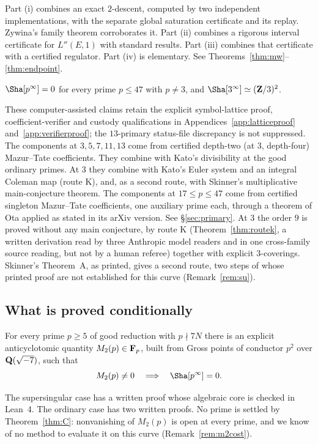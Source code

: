 Part (i) combines an exact $2$-descent, computed by two independent implementations, with the separate global saturation certificate and its replay. Zywina's family theorem \cite{zywina} corroborates it. Part (ii) combines a rigorous interval certificate for $L''(E,1)$ with standard results. Part (iii) combines that certificate with a certified regulator. Part (iv) is elementary. See Theorems~\ref{thm:mw}--\ref{thm:endpoint}.

\begin{theorem}\label{thm:B}
$\Sha[p^\infty]=0$ for every prime $p\le47$ with $p\ne3$, and $\Sha[3^\infty]\simeq(\Z/3)^2$.
\end{theorem}

These computer-assisted claims retain the explicit symbol-lattice proof, coefficient-verifier and custody qualifications in Appendices~\ref{app:latticeproof} and~\ref{app:verifierproof}; the $13$-primary status-file discrepancy is not suppressed. The components at $3,5,7,11,13$ come from certified depth-two (at $3$, depth-four) Mazur--Tate coefficients. They combine with Kato's divisibility at the good ordinary primes. At $3$ they combine with Kato's Euler system and an integral Coleman map (route K), and, as a second route, with Skinner's multiplicative main-conjecture theorem. The components at $17\le p\le47$ come from certified singleton Mazur--Tate coefficients, one auxiliary prime each, through a theorem of Ota \cite{ota} applied as stated in its arXiv version. See \S\ref{sec:primary}. At $3$ the order $9$ is proved without any main conjecture, by route K (Theorem~\ref{thm:routek}, a written derivation read by three Anthropic model readers and in one cross-family source reading, but not by a human referee) together with explicit $3$-coverings. Skinner's Theorem~A, as printed, gives a second route, two steps of whose printed proof are not established for this curve (Remark~\ref{rem:su}).

\subsection{What is proved conditionally}
\begin{theorem}\label{thm:C}
For every prime $p\ge5$ of good reduction with $p\nmid 7N$ there is an explicit anticyclotomic quantity $M_2(p)\in\mathbf{F}_p$, built from Gross points of conductor $p^2$ over $\mathbf{Q}(\sqrt{-7})$, such that
\[
M_2(p)\neq0\quad\Longrightarrow\quad \Sha[p^\infty]=0 .
\]
\end{theorem}
The supersingular case has a written proof whose algebraic core is checked in Lean~4. The ordinary case has two written proofs. No prime is settled by Theorem~\ref{thm:C}: nonvanishing of $M_2(p)$ is open at every prime, and we know of no method to evaluate it on this curve (Remark~\ref{rem:m2cost}).

